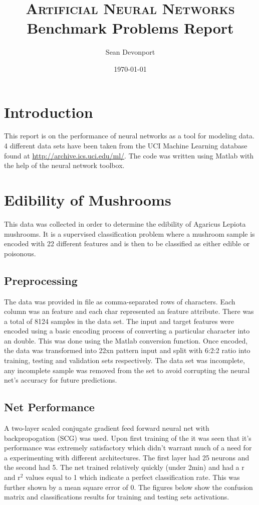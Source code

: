 \documentclass[10pt]{article}
\begin{document}
\title{
\textsc{Artificial Neural Networks} \\ [20pt]
\huge Benchmark Problems Report \\ %
}

\author{Sean Devonport} %

\date{\today} %
\maketitle 

\section{Introduction}
This report is on the performance of neural networks as a tool for modeling data. 4 different data sets have been taken from the UCI Machine Learning database found at \url{http://archive.ics.uci.edu/ml/}. The code was written using Matlab with the help of the neural network toolbox. 

\section{Edibility of Mushrooms}
This data was collected in order to determine the edibility of Agaricus Lepiota mushrooms. It is a supervised classification problem where a mushroom sample is encoded with 22 different features and is then to be classified as either edible or poisonous. 
\subsection{Preprocessing}
The data was provided in file as comma-separated rows of characters. Each column was an feature and each char represented an feature attribute. There was a total of 8124 samples in the data set. The input and target features were encoded using a basic encoding process of converting a particular character into an double. This was done using the Matlab conversion function. Once encoded, the data was transformed into 22xn pattern input and split with  6:2:2 ratio into training, testing and validation sets respectively. The data set was incomplete, any incomplete sample was removed from the set to avoid corrupting the neural net's accuracy for future predictions.

\subsection{Net Performance}
A two-layer scaled conjugate gradient feed forward neural net with backpropogation (SCG) was used. Upon first training of the it was seen that it's performance was extremely satisfactory which didn't warrant much of a need for a experimenting with different architectures. The first layer had 25 neurons and the second had 5. The net trained relatively quickly (under 2min) and had a r and r$^{2}$ values equal to 1 which indicate a perfect classification rate. This was further shown by a mean square error of 0. The figures below show the confusion matrix and classifications  results for training and testing sets activations. 
\newpage
\end{document}
